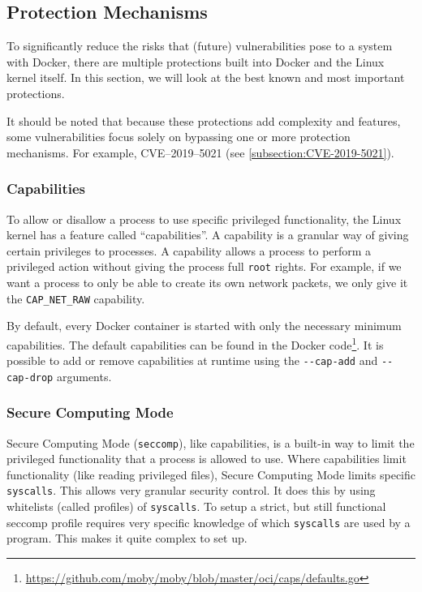 \subsection{Protection Mechanisms}
To significantly reduce the risks that (future) vulnerabilities pose to a system with Docker, there are multiple protections built into Docker and the Linux kernel itself. In this section, we will look at the best known and most important protections.

\medskip

It should be noted that because these protections add complexity and features, some vulnerabilities focus solely on bypassing one or more protection mechanisms. For example, CVE--2019--5021 (see \autoref{subsection:CVE-2019-5021}).

\subsubsection{Capabilities}\label{protection-mechanisms:subsection:capabilities}
To allow or disallow a process to use specific privileged functionality, the Linux kernel has a feature called ``capabilities''. A capability is a granular way of giving certain privileges to processes. A capability allows a process to perform a privileged action without giving the process full \lstinline{root} rights. For example, if we want a process to only be able to create its own network packets, we only give it the \lstinline{CAP_NET_RAW} capability.

\medskip

By default, every Docker container is started with only the necessary minimum capabilities. The default capabilities can be found in the Docker code\footnote{\url{https://github.com/moby/moby/blob/master/oci/caps/defaults.go}}. It is possible to add or remove capabilities at runtime using the \lstinline{--cap-add} and \lstinline{--cap-drop}\cite{More-Secure-Non-Root-Container} arguments.

\subsubsection{Secure Computing Mode}
Secure Computing Mode (\lstinline{seccomp}), like capabilities, is a built-in way to limit the privileged functionality that a process is allowed to use. Where capabilities limit functionality (like reading privileged files), Secure Computing Mode limits specific \lstinline{syscalls}. This allows very granular security control. It does this by using whitelists (called profiles) of \lstinline{syscalls}.
To setup a strict, but still functional seccomp profile requires very specific knowledge of which \lstinline{syscalls} are used by a program. This makes it quite complex to set up.


